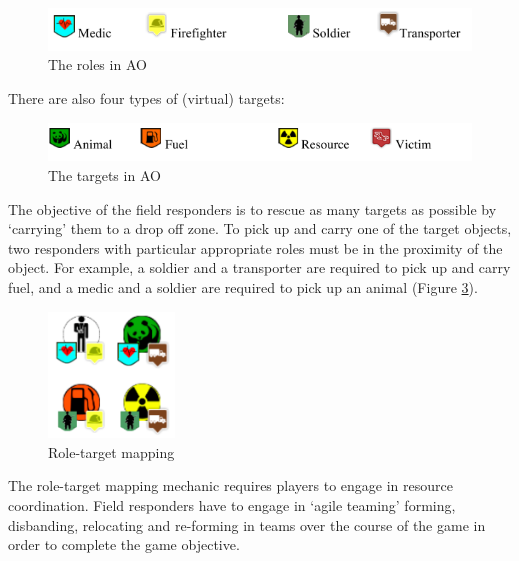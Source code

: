 \begin{figure}[h]
  \centering
  \includegraphics[width=1\textwidth]{img/approach/AOroles}
  \caption{The roles in \ac{AO}}
  \label{fig:AOroles}
\end{figure}

There are also four types of (virtual) targets:\\

\begin{figure}[h]
  \centering
  \includegraphics[width=1\textwidth]{img/approach/AOtargets}
  \caption{The targets in \ac{AO}}
  \label{fig:AOtargets}
\end{figure}

The objective of the field responders is to rescue as many targets as possible by `carrying' them to a drop off zone. To pick up and carry one of the target objects, two responders with particular appropriate roles must be in the proximity of the object. For example, a soldier and a transporter are required to pick up and carry fuel, and a medic and a soldier are required to pick up an animal (Figure \ref{fig:roleTargetMapping}).\\

\begin{figure}[h]
  \centering
  \includegraphics[width=0.3\textwidth]{img/approach/roleTargetMapping}
  \caption{Role-target mapping}
  \label{fig:roleTargetMapping}
\end{figure}

The role-target mapping mechanic requires players to engage in resource coordination. Field responders have to engage in `agile teaming' forming, disbanding, relocating and re-forming in teams over the course of the game in order to complete the game objective. \\

